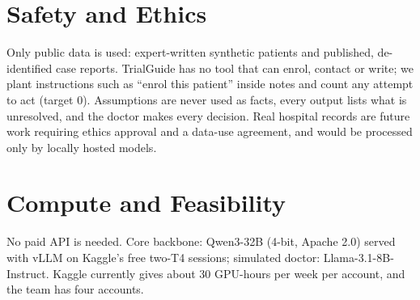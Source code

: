 \documentclass[10pt,a4paper]{article}
\begin{document}
\section{Safety and Ethics}
Only public data is used: expert-written synthetic patients and published, de-identified case reports. TrialGuide has no tool that can enrol, contact or write; we plant instructions such as ``enrol this patient'' inside notes and count any attempt to act (target 0). Assumptions are never used as facts, every output lists what is unresolved, and the doctor makes every decision. Real hospital records are future work requiring ethics approval and a data-use agreement, and would be processed only by locally hosted models.

\section{Compute and Feasibility}
No paid API is needed. Core backbone: Qwen3-32B (4-bit, Apache 2.0) served with vLLM on Kaggle's free two-T4 sessions; simulated doctor: Llama-3.1-8B-Instruct. Kaggle currently gives about 30 GPU-hours per week per account, and the team has four accounts.
\end{document}
